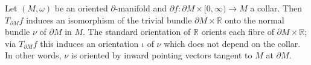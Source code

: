 Let $(M, \omega)$ be an oriented $\partial$-manifold and $\partial f: \partial M \times [0, \infty) \to M$ a collar. Then $T_{\partial M}f$ induces an isomorphism of the trivial bundle $\partial M \times \mathbb{R}$ onto the normal bundle $\nu$ of $\partial M$ in $M$. The standard orientation of $\mathbb{R}$ orients each fibre of $\partial M \times \mathbb{R}$; via $T_{\partial M}f$ this induces an orientation $\iota$ of $\nu$ which does not depend on the collar. In other words, $\nu$ is oriented by inward pointing vectors tangent to $M$ at $\partial M$.
